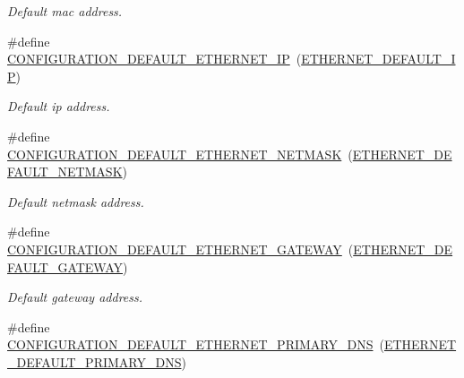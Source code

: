 \begin{DoxyCompactItemize}
\begin{DoxyCompactList}\small\item\em Default mac address. \end{DoxyCompactList}\item 
\mbox{\label{rmap-config_8h_ae03d41374839792a8b5585ebf9bdcd3b}} 
\#define \hyperlink{rmap-config_8h_ae03d41374839792a8b5585ebf9bdcd3b}{C\+O\+N\+F\+I\+G\+U\+R\+A\+T\+I\+O\+N\+\_\+\+D\+E\+F\+A\+U\+L\+T\+\_\+\+E\+T\+H\+E\+R\+N\+E\+T\+\_\+\+IP}~(\hyperlink{ethernet__config_8h_a708f80b356d050b3caada102553a6fb6}{E\+T\+H\+E\+R\+N\+E\+T\+\_\+\+D\+E\+F\+A\+U\+L\+T\+\_\+\+IP})
\begin{DoxyCompactList}\small\item\em Default ip address. \end{DoxyCompactList}\item 
\mbox{\label{rmap-config_8h_a6e0029e4ba852ab74d69263d934c7160}} 
\#define \hyperlink{rmap-config_8h_a6e0029e4ba852ab74d69263d934c7160}{C\+O\+N\+F\+I\+G\+U\+R\+A\+T\+I\+O\+N\+\_\+\+D\+E\+F\+A\+U\+L\+T\+\_\+\+E\+T\+H\+E\+R\+N\+E\+T\+\_\+\+N\+E\+T\+M\+A\+SK}~(\hyperlink{ethernet__config_8h_a549e67e6695e819967dde18ea96f106d}{E\+T\+H\+E\+R\+N\+E\+T\+\_\+\+D\+E\+F\+A\+U\+L\+T\+\_\+\+N\+E\+T\+M\+A\+SK})
\begin{DoxyCompactList}\small\item\em Default netmask address. \end{DoxyCompactList}\item 
\mbox{\label{rmap-config_8h_adb31ecf5d2e45dab1b0508a21313267b}} 
\#define \hyperlink{rmap-config_8h_adb31ecf5d2e45dab1b0508a21313267b}{C\+O\+N\+F\+I\+G\+U\+R\+A\+T\+I\+O\+N\+\_\+\+D\+E\+F\+A\+U\+L\+T\+\_\+\+E\+T\+H\+E\+R\+N\+E\+T\+\_\+\+G\+A\+T\+E\+W\+AY}~(\hyperlink{ethernet__config_8h_a47956941b8ebab9ce04debc51848bfbd}{E\+T\+H\+E\+R\+N\+E\+T\+\_\+\+D\+E\+F\+A\+U\+L\+T\+\_\+\+G\+A\+T\+E\+W\+AY})
\begin{DoxyCompactList}\small\item\em Default gateway address. \end{DoxyCompactList}\item 
\mbox{\label{rmap-config_8h_a7e0faf050a00ee299bd47f28d9b38c63}} 
\#define \hyperlink{rmap-config_8h_a7e0faf050a00ee299bd47f28d9b38c63}{C\+O\+N\+F\+I\+G\+U\+R\+A\+T\+I\+O\+N\+\_\+\+D\+E\+F\+A\+U\+L\+T\+\_\+\+E\+T\+H\+E\+R\+N\+E\+T\+\_\+\+P\+R\+I\+M\+A\+R\+Y\+\_\+\+D\+NS}~(\hyperlink{ethernet__config_8h_ae21c97b50820450862c66c8d1d7f07e8}{E\+T\+H\+E\+R\+N\+E\+T\+\_\+\+D\+E\+F\+A\+U\+L\+T\+\_\+\+P\+R\+I\+M\+A\+R\+Y\+\_\+\+D\+NS})

\end{DoxyCompactItemize}
